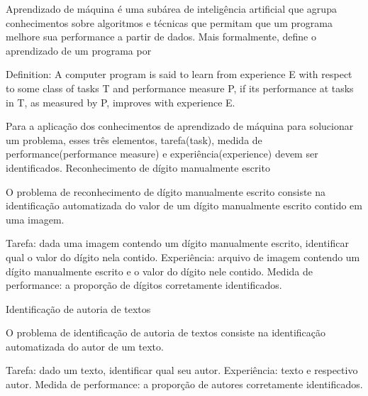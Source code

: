 Aprendizado de máquina é uma subárea de inteligência artificial que agrupa conhecimentos sobre algoritmos e técnicas que permitam que um programa melhore sua performance a partir de dados. Mais formalmente, \cite{Tom_mitchell} define o aprendizado de um programa por

Definition: A computer program is said to learn from experience E with respect to some class of tasks T and performance measure P, if its performance at tasks in T, as measured by P, improves with experience E. 

Para a aplicação dos conhecimentos de aprendizado de máquina para solucionar um problema, esses três elementos, tarefa(task), medida de performance(performance measure) e experiência(experience) devem ser identificados.
Reconhecimento de dígito manualmente escrito

O problema de reconhecimento de dígito manualmente escrito consiste na identificação automatizada do valor de um dígito manualmente escrito contido em uma imagem.

Tarefa: dada uma imagem contendo um dígito manualmente escrito, identificar qual o valor do dígito nela contido.
Experiência: arquivo de imagem contendo um dígito manualmente escrito e o valor do dígito nele contido.
Medida de performance: a proporção de dígitos corretamente identificados. 

Identificação de autoria de textos

O problema de identificação de autoria de textos consiste na identificação automatizada do autor de um texto.

Tarefa: dado um texto, identificar qual seu autor.
Experiência: texto e respectivo autor.
Medida de performance: a proporção de autores corretamente identificados.



\cite{ML_debt} \cite{ML_know}

